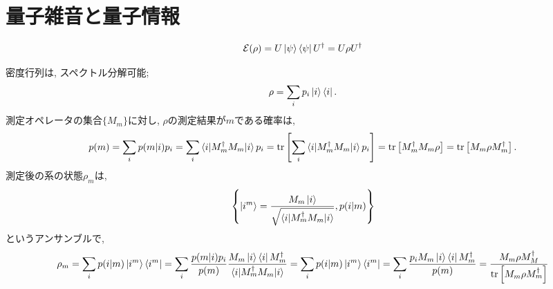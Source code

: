 \chapter{量子雑音と量子情報}

\begin{ex}
    \label{ex8.1}
    \begin{align*}
        \mathcal{E}(\rho)
        =
        U \ket{\psi} \bra{\psi} U^\dagger
        =
        U \rho U^\dagger
    \end{align*}
\end{ex}

\begin{ex}
    \label{ex8.2}
    密度行列は, スペクトル分解可能;
    \begin{align*}
        \rho = \sum_i p_i \ket{i} \bra{i}.
    \end{align*}
    測定オペレータの集合$\{ M_m\}$に対し, $\rho$の測定結果が$m$である確率は,
    \begin{align*}
        p(m) =
        \sum_i p(m|i) p_i
        =
        \sum_i \braket{i | M_m^\dagger M_m | i} p_i
        =
        \mathrm{tr} \left[ \sum_i \braket{i | M_m^\dagger M_m | i} p_i \right]
        =
        \mathrm{tr} \left[ M_m^\dagger M_m \rho\right]
        =
        \mathrm{tr} \left[M_m \rho  M_m^\dagger \right].
    \end{align*}
    測定後の系の状態$\rho_m$は,
    \begin{align*}
        \left\{ \ket{i^m} =
        \frac{M_m \ket{i}}{\sqrt{\braket{i|M_m^\dagger M_m | i}}},
        p(i|m)
        \right\}
    \end{align*}
    というアンサンブルで,
    \begin{align*}
        \rho_m
        =
        \sum_i p(i|m) \ket{i^m} \bra{i^m}
        =
        \sum_i
        \frac{p(m|i) p_i}{p(m)}
        \frac{M_m \ket{i} \bra{i} M_m^\dagger}
        {\braket{i|M_m^\dagger M_m | i}}
        =
        \sum_i p(i|m) \ket{i^m} \bra{i^m}
        =
        \sum_i
        \frac{p_i M_m \ket{i} \bra{i} M_m^\dagger}{p(m)}
        =
        \frac{M_m \rho M_M^\dagger}
        {\mathrm{tr}\left[ M_m \rho M_m^\dagger\right]}
    \end{align*}
\end{ex}

